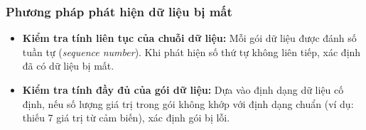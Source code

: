 \subsubsection{Phương pháp phát hiện dữ liệu bị mất}
\begin{itemize}
    \item \textbf{Kiểm tra tính liên tục của chuỗi dữ liệu:}  
    Mỗi gói dữ liệu được đánh số tuần tự (\textit{sequence number}). Khi phát hiện số thứ tự không liên tiếp, xác định đã có dữ liệu bị mất.
    
    \item \textbf{Kiểm tra tính đầy đủ của gói dữ liệu:}  
    Dựa vào định dạng dữ liệu cố định, nếu số lượng giá trị trong gói không khớp với định dạng chuẩn (ví dụ: thiếu 7 giá trị từ cảm biến), xác định gói bị lỗi.
\end{itemize}

